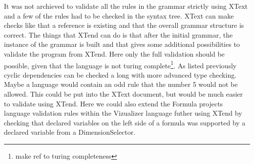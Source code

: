 It was not archieved to validate all the rules in the grammar strictly using XText and a few
of the rules had to be checked in the syntax tree. XText can make checks like that a reference is
existing and that the overall grammar structure is correct.
The things that XTend can do is that after the initial grammar, the instance of the grammar is
built and that gives some additional possibilities to validate the program from XTend. Here
only the full validation should be possible, given that the language is not turing
complete\footnote{make ref to turing completeness}. As listed previously cyclic dependencies
can be checked a long with more advanced type checking. Maybe a language would contain an odd
rule that the number 5 would not be allowed. This could be put into the XText document,
but would be much easier to validate using XTend. Here we could also extend the Formula projects
language validation rules within the Vizualizer language futher using XTend by checking that
declared variables on the left side of a formula was supported by a declared variable from
a DimensionSelector. 

